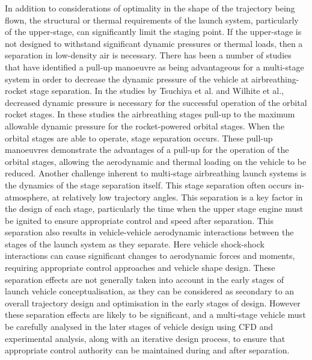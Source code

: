 In addition to considerations of optimality in the shape of the trajectory being flown, the structural or thermal requirements of the launch system, particularly of the upper-stage, can significantly limit the staging point. If the upper-stage is not designed to withstand significant dynamic pressures or thermal loads, then a separation in low-density air is necessary. 
There has been a number of studies that have identified a pull-up manoeuvre as being advantageous for a multi-stage system in order to decrease the dynamic pressure of the vehicle at airbreathing-rocket stage separation\cite{Tsuchiya2005,Wilhite1991,Mehta2001}. 
In the studies by Tsuchiya et al.\cite{Tsuchiya2005} and Wilhite et al.\cite{Wilhite1991}, decreased dynamic pressure is necessary for the successful operation of the orbital rocket stages. In these studies the airbreathing stages pull-up to the maximum allowable dynamic pressure for the rocket-powered orbital stages. When the orbital stages are able to operate, stage separation occurs. These pull-up manoeuvres demonstrate the advantages of a pull-up for the operation of the orbital stages, allowing the aerodynamic and thermal loading on the vehicle to be reduced. 
Another challenge inherent to multi-stage airbreathing launch systems is the dynamics of the stage separation itself. This stage separation often occurs in-atmosphere, at relatively low trajectory angles. This separation is a key factor in the design of each stage, particularly the time when the upper stage engine must be ignited to ensure appropriate control and speed after separation. This separation also results in vehicle-vehicle aerodynamic interactions between the stages of the launch system as they separate. Here vehicle shock-shock interactions can cause significant changes to aerodynamic forces and moments, requiring appropriate control approaches and vehicle shape design\cite{mochammad,Kudo2005}. 
These separation effects are not generally taken into account in the early stages of launch vehicle conceptualisation, as they can be considered as secondary to an overall trajectory design and optimisation in the early stages of design.  %
However these separation effects are likely to be significant, and a multi-stage vehicle must be carefully analysed in the later stages of vehicle design using CFD and experimental analysis, along with an iterative design process, to ensure that appropriate control authority can be maintained during and after separation\cite{mochammad}. 


